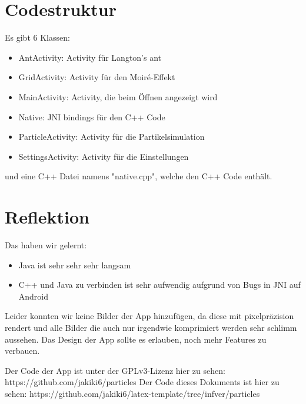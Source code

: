 \documentclass[8pt, letterpaper]{article}
\begin{document}
\section{Codestruktur}
Es gibt 6 Klassen:
\begin{itemize}
    \item AntActivity: Activity für Langton's ant
    \item GridActivity: Activity für den Moiré-Effekt
    \item MainActivity: Activity, die beim Öffnen angezeigt wird
    \item Native: JNI bindings für den C++ Code
    \item ParticleActivity: Activity für die Partikelsimulation
    \item SettingsActivity: Activity für die Einstellungen
\end{itemize}

und eine C++ Datei namens "native.cpp", welche den C++ Code enthält.

\section{Reflektion}
Das haben wir gelernt:
\begin{itemize}
    \item Java ist sehr sehr sehr langsam
    \item C++ und Java zu verbinden ist sehr aufwendig aufgrund von Bugs in JNI auf Android
\end{itemize}

Leider konnten wir keine Bilder der App hinzufügen, da diese mit pixelpräzision rendert und alle Bilder die auch nur irgendwie komprimiert werden sehr schlimm aussehen.
Das Design der App sollte es erlauben, noch mehr Features zu verbauen.

Der Code der App ist unter der GPLv3-Lizenz hier zu sehen: https://github.com/jakiki6/particles
Der Code dieses Dokuments ist hier zu sehen: https://github.com/jakiki6/latex-template/tree/infver/particles
\end{document}
